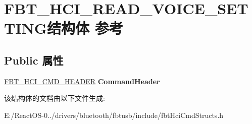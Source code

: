 \hypertarget{struct_f_b_t___h_c_i___r_e_a_d___v_o_i_c_e___s_e_t_t_i_n_g}{}\section{F\+B\+T\+\_\+\+H\+C\+I\+\_\+\+R\+E\+A\+D\+\_\+\+V\+O\+I\+C\+E\+\_\+\+S\+E\+T\+T\+I\+N\+G结构体 参考}
\label{struct_f_b_t___h_c_i___r_e_a_d___v_o_i_c_e___s_e_t_t_i_n_g}
\subsection*{Public 属性}
\begin{DoxyCompactItemize}
\item 
\mbox{\label{struct_f_b_t___h_c_i___r_e_a_d___v_o_i_c_e___s_e_t_t_i_n_g_a75e795b376b6697f5e7e49cb1fa47fe5}} 
\hyperlink{struct_f_b_t___h_c_i___c_m_d___h_e_a_d_e_r}{F\+B\+T\+\_\+\+H\+C\+I\+\_\+\+C\+M\+D\+\_\+\+H\+E\+A\+D\+ER} {\bfseries Command\+Header}
\end{DoxyCompactItemize}


该结构体的文档由以下文件生成\+:\begin{DoxyCompactItemize}
\item 
E\+:/\+React\+O\+S-\/0../drivers/bluetooth/fbtusb/include/fbt\+Hci\+Cmd\+Structs.\+h\end{DoxyCompactItemize}
